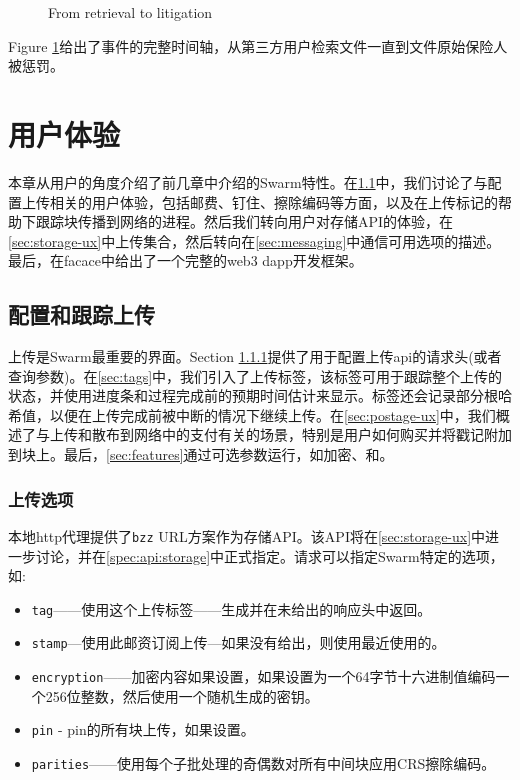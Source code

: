 \begin{figure}[htbp]
  \centering
  \caption[From retrieval to litigation \statusred]{From retrieval to litigation}
  \label{fig:flowchart-retrieval-litigation}
\end{figure}


Figure \ref{fig:flowchart-retrieval-litigation}给出了事件的完整时间轴，从第三方用户检索文件一直到文件原始保险人被惩罚。





\chapter{用户体验}\label{sec:ux}

本章从用户的角度介绍了前几章中介绍的Swarm特性。在\ref{sec:upload}中，我们讨论了与配置上传相关的用户体验，包括邮费、钉住、擦除编码等方面，以及在上传标记的帮助下跟踪块传播到网络的进程。然后我们转向用户对存储API的体验，在\ref{sec:storage-ux}中上传集合，然后转向在\ref{sec:messaging}中通信可用选项的描述。最后，在facace中给出了一个完整的web3 dapp开发框架。

\section{配置和跟踪上传\statusgreen}\label{sec:upload}

\green{}

上传是Swarm最重要的界面。Section \ref{sec:headers}提供了用于配置上传api的请求头(或者查询参数)。在\ref{sec:tags}中，我们引入了上传标签，该标签可用于跟踪整个上传的状态，并使用进度条和过程完成前的预期时间估计来显示。标签还会记录部分根哈希值，以便在上传完成前被中断的情况下继续上传。在\ref{sec:postage-ux}中，我们概述了与上传和散布到网络中的支付有关的场景，特别是用户如何购买并将戳记附加到块上。最后，\ref{sec:features}通过可选参数运行，如加密、和。

\subsection{上传选项\statusgreen}\label{sec:headers}

本地http代理提供了\lstinline{bzz} URL方案作为存储API。该API将在\ref{sec:storage-ux}中进一步讨论，并在\ref{spec:api:storage}中正式指定。请求可以指定Swarm特定的选项，如:

\begin{itemize}
\item \lstinline{tag}——使用这个上传标签——生成并在未给出的响应头中返回。 
\item \lstinline{stamp}—使用此邮资订阅上传—如果没有给出，则使用最近使用的。 
\item \lstinline{encryption}——加密内容如果设置，如果设置为一个64字节十六进制值编码一个256位整数，然后使用一个随机生成的密钥。 
\item \lstinline{pin} - pin的所有块上传，如果设置。 
\item \lstinline{parities}——使用每个子批处理的奇偶数对所有中间块应用CRS擦除编码。
\end{itemize}

